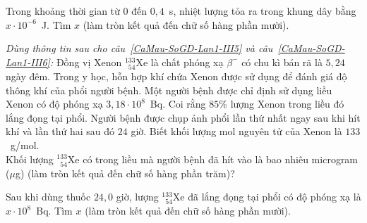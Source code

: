 	\begin{ex}%
		\label{CaMau-SoGD-Lan1-III4}Trong khoảng thời gian từ $0$ đến $0{,}4$~s, nhiệt lượng tỏa ra trong khung dây bằng $x\cdot 10^{-6}$~J. Tìm $x$ (làm tròn kết quả đến chữ số hàng phần mười).
		\par
	\end{ex}

	\begin{ex}%
		\label{CaMau-SoGD-Lan1-III5}\textit{Dùng thông tin sau cho câu~\ref{CaMau-SoGD-Lan1-III5} và câu~\ref{CaMau-SoGD-Lan1-III6}:} Đồng vị Xenon ${}^{133}_{\phantom{1}54}\text{Xe}$ là chất phóng xạ $\beta^-$ có chu kì bán rã là $5{,}24$ ngày đêm. Trong y học, hỗn hợp khí chứa Xenon được sử dụng để đánh giá độ thông khí của phổi người bệnh. Một người bệnh được chỉ định sử dụng liều Xenon có độ phóng xạ $3{,}18\cdot 10^8$~Bq. Coi rằng $85\%$ lượng Xenon trong liều đó lắng đọng tại phổi. Người bệnh được chụp ảnh phổi lần thứ nhất ngay sau khi hít khí và lần thứ hai sau đó $24$ giờ. Biết khối lượng mol nguyên tử của Xenon là $133$~g/mol.\\
		Khối lượng ${}^{133}_{\phantom{1}54}\text{Xe}$ có trong liều mà người bệnh đã hít vào là bao nhiêu microgram ($\mu$g) (làm tròn kết quả đến chữ số hàng phần trăm)?
		\par
	\end{ex}

	\begin{ex}%
		\label{CaMau-SoGD-Lan1-III6}Sau khi dùng thuốc $24{,}0$ giờ, lượng ${}^{133}_{\phantom{1}54}\text{Xe}$ đã lắng đọng tại phổi có độ phóng xạ là $x\cdot 10^8$~Bq. Tìm $x$ (làm tròn kết quả đến chữ số hàng phần mười).
		\par
	\end{ex}

